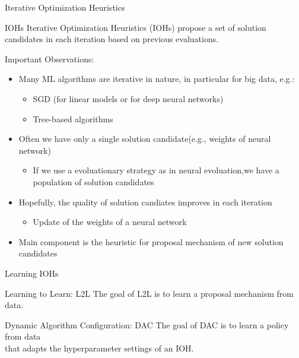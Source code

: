 \begin{frame}[c]{Iterative Optimization Heuristics}

\begin{block}{IOHs}
	Iterative Optimization Heuristics (IOHs) propose a set of solution candidates in each iteration
	based on previous evaluations.
\end{block}

\pause
\smallskip
Important Observations:
\begin{itemize}
	\item Many ML algorithms are  \alert{iterative} in nature, in particular for big data, e.g.:
	\begin{itemize}
		\item SGD (for linear models or for deep neural networks)
		\item Tree-based algorithms
	\end{itemize}
	\pause
	\smallskip
	\item Often we have only a \alert{single solution candidate}\newline (e.g., weights of neural network)
	\begin{itemize}
		\item If we use a evoluationary strategy as in neural evoluation,\newline we have a population of solution candidates
	\end{itemize}
	\pause
	\smallskip
	\item Hopefully, the \alert{quality} of solution candiates \alert{improves} in each iteration
	\begin{itemize}
		\item Update of the weights of a neural network
	\end{itemize}
	\pause
	\smallskip
	\item Main component is the \alert{heuristic for proposal mechanism} of new solution candidates
\end{itemize}

\end{frame}
\begin{frame}[c]{Learning IOHs}
	
\begin{block}{Learning to Learn: L2L}
	The goal of L2L is to learn a \alert{proposal mechanism} from data.
\end{block}


\bigskip
\pause

\begin{block}{Dynamic Algorithm Configuration: DAC}
	The goal of DAC is to learn a policy from data\\ that adapts the \alert{hyperparameter settings} of an IOH.
\end{block}

	
\end{frame}

